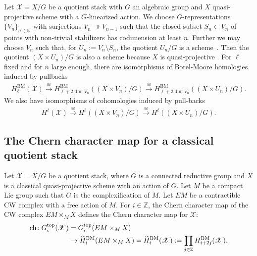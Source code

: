 \documentclass [11pt,oneside,a4paper,mathscr]{amsart}
\theoremstyle{definition}
\newcommand{\X}{\mathscr{X}}
\begin{document}
Let $\X=X/G$ be a quotient stack with $G$ an algebraic group and $X$ quasi-projective scheme with a $G$-linearized
action. 
We choose $G$-representations
$\{V_n\}_{n\in \mathbb{N}}$ with surjections 
$V_n\twoheadrightarrow V_{n-1}$ such that
the closed subset $S_n \subset V_n$ 
of points with non-trivial stabilizers 
has codimension at least $n$. Further we may choose $V_n$ such that, for $U_n:=V_n\setminus S_n$, the quotient $U_n/G$ is a scheme~\cite[Lemma 9]{EdidinGraham2}. 
Then the quotient $(X\times U_n)/G$ is also a scheme because $X$ is quasi-projective \cite[Proposition 23]{EdidinGraham2}.
For $\ell$ fixed and for $n$ large enough, there are isomorphisms of Borel-Moore homologies 
induced by pullbacks
\begin{align}\label{isom:BM:pullback}
H^{\mathrm{BM}}_\ell(\mathscr{X})\xrightarrow{\cong}
 H^{\mathrm{BM}}_{\ell+2\dim V_n}((X\times V_n)/G)\xrightarrow{\cong}  H^{\mathrm{BM}}_{\ell+2\dim V_n}\left((X\times U_n)/G\right).
 \end{align}
 We also have isomorphisms of cohomologies 
 induced by pull-backs
 \begin{align}\label{isom:coh:pullback}
H^{\ell}(\mathscr{X})\xrightarrow{\cong} H^\ell((X\times V_n)/G)\xrightarrow{\cong} H^\ell\left((X\times U_n)/G\right).
\end{align}




\subsection{The Chern character map for a classical quotient stack}\label{section31}



Let $\X=X/G$ be a quotient stack, 
 where $G$ is a connected reductive group and $X$ is a classical quasi-projective scheme with an action of $G$. Let $M$ be a compact Lie group such that $G$ is the complexification of $M$.
Let $EM$ be a contractible CW complex with a free action of $M$. For $i\in \mathbb{Z}$, 
the Chern character map of the CW complex $EM\times_M X$
defines the Chern character map for $\X$:
\begin{align}\label{chernstack}
\mathrm{ch}\colon G^{\mathrm{top}}_i(\mathscr{X})&=G^{\mathrm{top}}_i(EM\times_M X) \\
\notag&\to \widetilde{H}^{\mathrm{BM}}_i(EM\times_M X)=\widetilde{H}^{\mathrm{BM}}_i(\mathscr{X}):=\prod_{j\in\mathbb{Z}}H^{\mathrm{BM}}_{i+2j}(\mathscr{X}).
\end{align}
\end{document}
